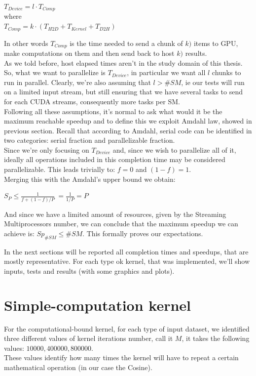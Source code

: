 \begin{center}
	\(T_{Device} = l \cdot T_{Comp}\)\\
	where\\
	\(T_{Comp}=k \cdot(T_{H2D} + T_{Kernel} + T_{D2H})\)\\
\end{center}
In other words 	\(T_{Comp}\) is the time needed to send a chunk of \(k)\)
items to GPU, make computations on them and then send back to host  \(k)\) results.\\
As we told before, host elapsed times aren't in the study domain of this thesis. So, what we want to parallelize is \(T_{Device}\), in particular we want all \(l\) chunks to run in parallel. Clearly, we're also assuming that \(l > \#SM\), ie our tests will run on a limited input stream, but still ensuring that we have several tasks to send for each CUDA streams, consequently more tasks per SM.\\
Following all these assumptions, it's normal to ask what would it be the maximum reachable speedup and to define this we exploit Amdahl law, showed in previous section. Recall that according to Amdahl, serial code can be identified in two categories: serial fraction and parallelizable fraction.\\
Since we're only focusing on \(T_{Device}\) and, since we wish to parallelize all of it, ideally all operations included in this completion time may be considered parallelizable. This leads trivially to: \(f=0\) and  \((1-f)=1\).\\
Merging this with the Amdahl's upper bound we obtain:
\begin{center}
		\(S_{P} \leq \frac{1}{f+(1-f)/P}\   = \frac{1}{1/P}=P\)
\end{center}
And since we have a limited amount of resources, given by the Streaming Multiprocessors number, we can conclude that the maximum speedup we can achieve is: \(Sp_{\#SM} \leq \#SM\). This formally proves our expectations.


In the next sections will be reported all completion times and speedups, that are mostly representative. 
For each type ok kernel, that was implemented,  we'll show inputs, tests and results (with some graphics and plots).




\section{Simple-computation kernel}
For the computational-bound kernel, for each type of input dataset, we identified three different values of kernel iterations number, call it \(M\), it takes the following values: \(10 000, 400 000, 800 000\).\\
These values identify how many times the kernel will have to repeat a certain mathematical operation (in our case the Cosine).

